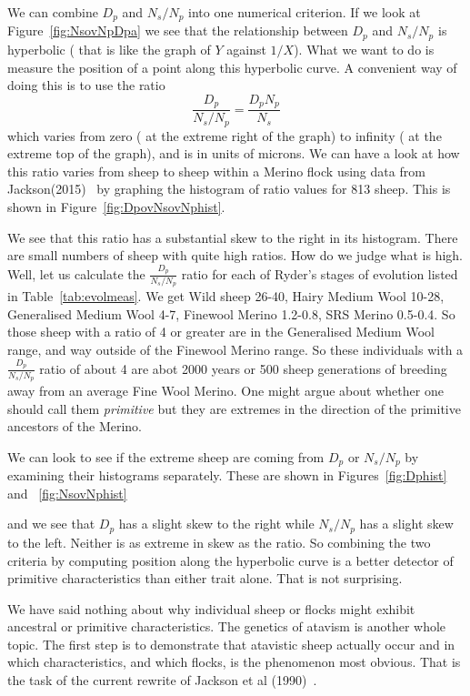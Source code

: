 \documentclass[titlepage]{article}  %
\begin{document}
We can combine $D_{p}$ and $N_{s}/N_{p}$ into one numerical criterion. If we look at Figure~\ref{fig:NsovNpDpa} we see that the relationship between $D_{p}$ and $N_{s}/N_{p}$ is hyperbolic ( that is like the graph of $Y$ against $1/X$). What we want to do is measure the position of a point along this hyperbolic curve. A convenient way of doing this is to use the ratio
\begin{displaymath}
\frac{D_{p}}{N_{s}/N_{p}} = \frac{D_{p} N_{p}}{N_{s}}
\end{displaymath}
which varies from zero ( at the extreme right of the graph) to infinity ( at the extreme top of the graph), and is in units of microns. 
We can have a look at how this ratio varies from sheep to sheep within a Merino flock using data from Jackson(2015)~\cite{jack:15} by graphing the histogram of ratio values for 813 sheep. This is shown in Figure~\ref{fig:DpovNsovNphist}.

We see that this ratio has a substantial skew to the right in its histogram. There are small numbers of sheep with quite high ratios. How do we judge what is high. Well, let us calculate the $\frac{D_{p}}{N_{s}/N_{p}}$ ratio for each of Ryder's stages of evolution listed in Table~\ref{tab:evolmeas}. We get Wild sheep 26-40, Hairy Medium Wool 10-28, Generalised Medium Wool 4-7, Finewool Merino 1.2-0.8, SRS Merino 0.5-0.4. So those sheep with a ratio of 4 or greater are in the Generalised Medium Wool range, and way outside of the Finewool Merino range. So these individuals with a $\frac{D_{p}}{N_{s}/N_{p}}$ ratio of about 4 are abot 2000 years or 500 sheep generations of breeding away from an average Fine Wool Merino. One might argue about whether one should call them {\em primitive} but they are extremes in the direction of the primitive ancestors of the Merino.

We can look to see if the extreme sheep are coming from $D_{p}$ or $N_{s}/N_{p}$ by examining their histograms separately. These are shown in Figures~\ref{fig:Dphist} and ~\ref{fig:NsovNphist}


and we see that $D_{p}$ has a slight skew to the right while $N_{s}/N_{p}$ has a slight skew to the left. Neither is as extreme in skew as the ratio. So combining the two criteria by computing position along the hyperbolic curve is a better detector of primitive characteristics than either trait alone.  That is not surprising. 

We have said nothing about why individual sheep or flocks might exhibit  ancestral or primitive characteristics. The genetics of atavism is another whole topic. The first step is to demonstrate that atavistic sheep actually occur and in which characteristics, and which flocks, is the phenomenon most obvious.  That is the task of the current rewrite of Jackson et al (1990)~\cite{jack:90}.
\end{document}
